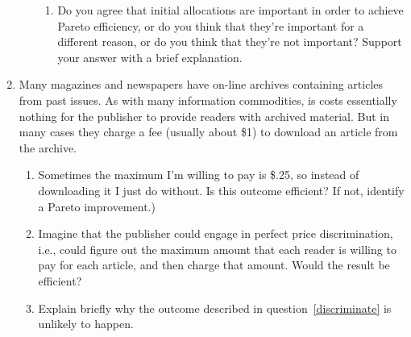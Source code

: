 \begin{enumerate}
\begin{enumerate}
\begin{enumerate}
        \item Do you agree that initial allocations are important in order to achieve Pareto efficiency, or do you think that they're important for a different reason, or do you think that they're not important?  Support your answer with a brief explanation.

        \end{enumerate}

    \end{enumerate}









\item Many magazines and newspapers have on-line archives containing articles from past issues. As with many information commodities, is costs essentially nothing for the publisher to provide readers with archived material. But in many cases they charge a fee (usually about \$1) to download an article from the archive.

    \begin{enumerate}

    \item Sometimes the maximum I'm willing to pay is \$.25, so instead of downloading it I just do without. Is this outcome efficient? %
If not, identify a Pareto improvement.)


    \item \label{discriminate} Imagine that the publisher could engage in perfect price discrimination, i.e., could figure out the maximum amount that each reader is willing to pay for each article, and then charge that amount. Would the result be efficient? %


    \item Explain briefly why the outcome described in question~\ref{discriminate} is unlikely to happen.

    \end{enumerate}



\end{enumerate}



